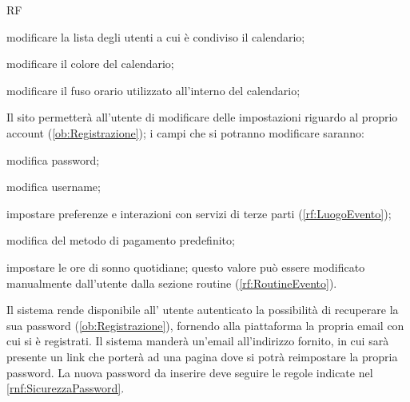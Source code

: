 \begin{listaPersonale}{RF}
\begin{listaPersonale2}[RF]{}
		 modificare la lista degli utenti a cui è condiviso il calendario;

		 modificare il colore del calendario;

		 modificare il fuso orario utilizzato all'interno del calendario;
	\end{listaPersonale2}

	 Il sito permetterà all'utente di modificare delle impostazioni riguardo al proprio account (\ref{ob:Registrazione}); i campi che si potranno modificare saranno:
	\begin{listaPersonale2}[RF]{}
		 modifica password;

		 modifica username;

		 impostare preferenze e interazioni con servizi di terze parti (\ref{rf:LuogoEvento});

		 modifica del metodo di pagamento predefinito;

		 impostare le ore di sonno quotidiane; questo valore può essere modificato manualmente dall'utente dalla sezione routine (\ref{rf:RoutineEvento}).
	\end{listaPersonale2}

	        Il sistema rende disponibile all' utente autenticato la possibilità di recuperare la sua password (\ref{ob:Registrazione}), fornendo alla piattaforma la propria email con cui si è registrati. Il sistema manderà un'email all'indirizzo fornito, in cui sarà presente un link che porterà ad una pagina dove si potrà reimpostare la propria password. La nuova password da inserire deve seguire le regole indicate nel  \ref{rnf:SicurezzaPassword}. %
\end{listaPersonale}